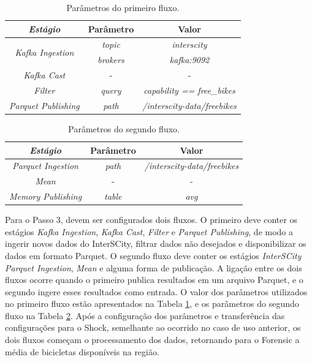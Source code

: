 \begin{table}[hbt]
    \centering
    \caption{Parâmetros do primeiro fluxo.}
    \label{tab:case2-1}
    \begin{tabular}{|c|c|c|}
        \hline
        \textit{\textbf{Estágio}}                   & \textbf{Parâmetro} & \textbf{Valor}                      \\ \hline
        \multirow{2}{*}{\textit{Kafka Ingestion}} & \textit{topic}     & \textit{interscity}                 \\ \cline{2-3} 
                                                  & \textit{brokers}   & \textit{kafka:9092}                 \\ \hline
                                                  \textit{Kafka Cast}                       & -                  & -                                   \\ \hline
                                                  \textit{Filter}                           & \textit{query}     & \textit{capability == free\_bikes}  \\ \hline
                                                  \textit{Parquet Publishing}               & \textit{path}      & \textit{/interscity-data/freebikes} \\ \hline
    \end{tabular}
\end{table}

\begin{table}[hbt]
\centering
    \caption{Parâmetros do segundo fluxo.}
\label{tab:case2-2}
\begin{tabular}{|c|c|c|}
\hline
\textit{\textbf{Estágio}}    & \textbf{Parâmetro} & \textbf{Valor}                      \\ \hline
\textit{Parquet Ingestion} & \textit{path}      & \textit{/interscity-data/freebikes} \\ \hline
\textit{Mean}              & -                  & -                                   \\ \hline
\textit{Memory Publishing} & \textit{table}     & \textit{avg}                        \\ \hline
\end{tabular}
\end{table}

Para o Passo 3, devem ser configurados dois fluxos. O primeiro deve
conter os estágios \textit{Kafka Ingestion}, \textit{Kafka Cast},
\textit{Filter} e \textit{Parquet Publishing}, de modo a ingerir novos dados
do InterSCity, filtrar dados não desejados e disponibilizar os dados em formato
Parquet. O segundo fluxo deve conter os estágios
\textit{InterSCity Parquet Ingestion}, \textit{Mean} e alguma forma de
publicação. A ligação entre os dois fluxos ocorre quando o primeiro
publica resultados em um arquivo Parquet, e o segundo
ingere esses resultados como entrada. O valor dos parâmetros
utilizados no primeiro fluxo estão apresentados na Tabela
\ref{tab:case2-1}, e os parâmetros do segundo fluxo na Tabela
\ref{tab:case2-2}. Após a configuração dos parâmetros e transferência das
configurações para o Shock, semelhante ao ocorrido no caso de uso anterior,
os dois fluxos começam o processamento dos dados, retornando para o
Forensic a média de bicicletas disponíveis na região.
